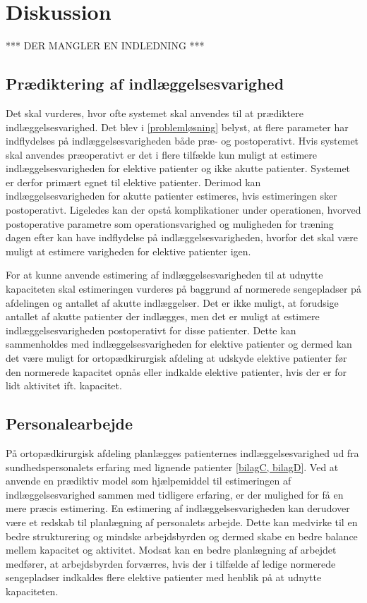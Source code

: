 \section{Diskussion}
*** DER MANGLER EN INDLEDNING ***


\subsection{Prædiktering af indlæggelsesvarighed}
Det skal vurderes, hvor ofte systemet skal anvendes til at prædiktere indlæggelsesvarighed. Det blev i \ref{problemløsning} belyst, at flere parameter har indflydelses på indlæggelsesvarigheden både præ- og postoperativt. Hvis systemet skal anvendes præoperativt er det i flere tilfælde kun muligt at estimere indlæggelsesvarigheden for elektive patienter og ikke akutte patienter. Systemet er derfor primært egnet til elektive patienter. Derimod kan indlæggelsesvarigheden for akutte patienter estimeres, hvis estimeringen sker postoperativt. Ligeledes kan der opstå komplikationer under operationen, hvorved postoperative parametre som operationsvarighed  og muligheden for træning dagen efter kan have indflydelse på indlæggelsesvarigheden, hvorfor det skal være muligt at estimere varigheden for elektive patienter igen. 

For at kunne anvende estimering af indlæggelsesvarigheden til at udnytte kapaciteten skal estimeringen vurderes på baggrund af normerede sengepladser på afdelingen og antallet af akutte indlæggelser. Det er ikke muligt, at forudsige antallet af akutte patienter der indlægges, men det er muligt at estimere indlæggelsesvarigheden postoperativt for disse patienter. Dette kan sammenholdes med indlæggelsesvarigheden for elektive patienter og dermed kan det være muligt for ortopædkirurgisk afdeling at udskyde elektive patienter før den normerede kapacitet opnås eller indkalde elektive patienter, hvis der er for lidt aktivitet ift. kapacitet.

\subsection{Personalearbejde}
På ortopædkirurgisk afdeling planlægges patienternes indlæggelsesvarighed ud fra sundhedspersonalets erfaring med lignende patienter \ref{bilagC, bilagD}. Ved at anvende en prædiktiv model som hjælpemiddel til estimeringen af indlæggelsesvarighed sammen med tidligere erfaring, er der mulighed for få en mere præcis estimering. 
En estimering af indlæggelsesvarigheden kan  derudover være et redskab til planlægning af personalets arbejde. Dette kan medvirke til en bedre strukturering og mindske arbejdsbyrden og dermed skabe en bedre balance mellem kapacitet og aktivitet. Modsat kan en bedre planlægning af arbejdet medfører, at arbejdsbyrden forværres, hvis der i tilfælde af ledige normerede sengepladser indkaldes flere elektive patienter med henblik på at udnytte kapaciteten. 


